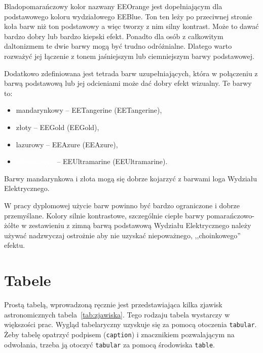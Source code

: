 Bladopomarańczowy kolor nazwany \textcolor{EEOrange}{EEOrange} jest dopełniającym dla podstawowego koloru wydziałowego EEBlue. Ton ten leży po przeciwnej stronie koła barw niż ton podstawowy a więc tworzy z nim silny kontrast. Może to dawać bardzo dobry lub bardzo kiepski efekt. Ponadto dla osób z całkowitym daltonizmem te dwie barwy mogą być trudno odróżnialne. Dlatego warto rozważyć jej łączenie z tonem jaśniejszym lub ciemniejszym barwy podstawowej.

Dodatkowo zdefiniowana jest tetrada barw uzupełniających, która w połączeniu z barwą podstawową lub jej odcieniami może dać dobry efekt wizualny. Te barwy to:
\begin{itemize}
	\item \colorbox{EETangerine}{mandarynkowy} -- \textcolor{EETangerine}{EETangerine} (EETangerine),
	\item \colorbox{EEGold}{złoty} --  \textcolor{EEGold}{EEGold} (EEGold),
	\item \colorbox{EEAzure}{lazurowy} --  \textcolor{EEAzure}{EEAzure} (EEAzure),
	\item \colorbox{EEUltramarine}{\textcolor{white}{ultramaryna}} --  \textcolor{EEUltramarine}{EEUltramarine} (EEUltramarine).
\end{itemize}
Barwy mandarynkowa i złota mogą się dobrze kojarzyć z barwami loga Wydziału Elektrycznego.

W pracy dyplomowej użycie barw powinno być bardzo ograniczone i dobrze przemyślane. Kolory silnie kontrastowe, szczególnie ciepłe barwy pomarańczowo-żółte w zestawieniu z zimną barwą podstawową Wydziału Elektrycznego należy używać nadzwyczaj ostrożnie aby nie uzyskać niepoważnego, ,,choinkowego'' efektu.

\section{Tabele}
Prostą tabelą, wprowadzoną ręcznie jest przedstawiająca kilka zjawisk astronomicznych tabela~\ref{tab:zjawiska}. Tego rodzaju tabela wystarczy w większości prac. Wygląd tabelaryczny uzyskuje się za pomocą otoczenia \texttt{tabular}. Żeby tabelę opatrzyć podpisem (\texttt{caption}) i znacznikiem pozwalającym na odwołania, trzeba ją otoczyć \texttt{tabular} za pomocą środowiska \texttt{table}.

